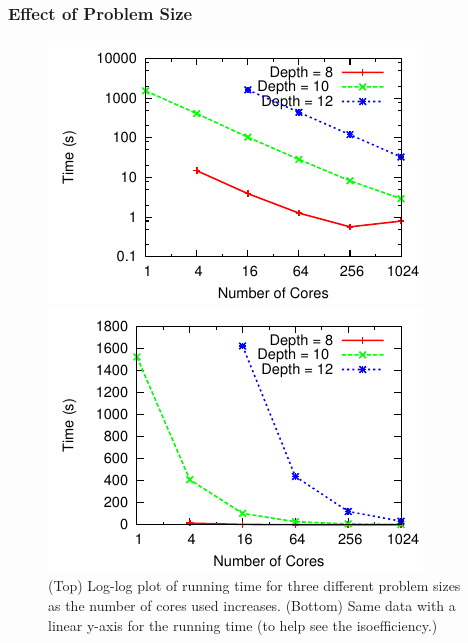 \documentclass[times, 10pt,twocolumn]{article}
\begin{document}
\subsubsection{Effect of Problem Size}
\begin{figure}[h]
\centering
\begin{minipage}{0.7\linewidth}
\includegraphics[width=\columnwidth]{plots/3depths.pdf}
\end{minipage}
\centering
\begin{minipage}{0.7\linewidth}
\includegraphics[width=\columnwidth]{plots/3depthsnolog.pdf}
\end{minipage}
\vspace{-0.1in}

\caption{(Top) Log-log plot of running time for three different problem sizes
as the number of cores used increases.  (Bottom) Same data with a linear y-axis
for the running time (to help see the isoefficiency.)}

\vspace{-0.2in}
\label{3depths}
\end{figure}
\end{document}
